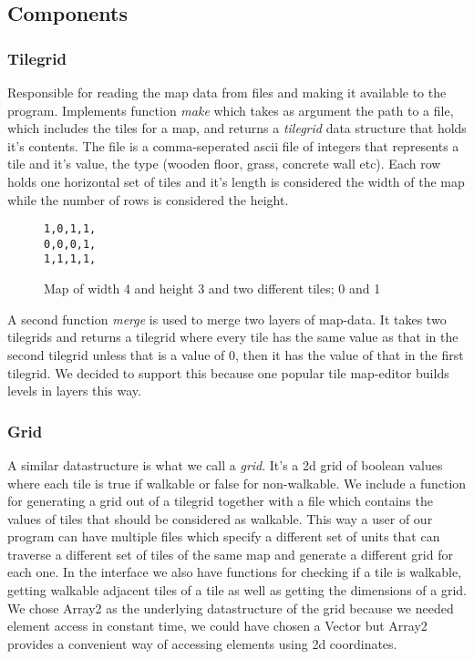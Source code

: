 \documentclass[12pt, a4paper]{article}
\begin{document}
\subsection{Components}

\subsubsection{Tilegrid}


Responsible for reading the map data from files and making it available to
the program. Implements function \textit{make} which takes as argument the
path to a file, which includes the tiles for a map, and returns a
\textit{tilegrid} data structure that holds it's contents. The file is a
comma-seperated ascii file of integers that represents a tile and it's
value, the type (wooden floor, grass, concrete wall etc). Each row holds
one horizontal set of tiles and it's length is considered the width of the
map while the number of rows is considered the height.

\begin{figure}[htbp]

\centering

\texttt{1,0,1,1,\\
0,0,0,1,\\
1,1,1,1,\\
}

\caption{Map of width 4 and height 3 and two different tiles; 0 and 1}

\end{figure}


A second function \textit{merge} is used to merge two layers of map-data.
It takes two tilegrids and returns a tilegrid where every tile has the same
value as that in the second tilegrid unless that is a value of 0, then it
has the value of that in the first tilegrid. We decided to support this
because one popular tile map-editor\cite{mapeditor} builds levels in layers
this way.


\subsubsection{Grid}


A similar datastructure is what we call a \textit{grid}. It's a 2d grid of
boolean values where each tile is true if walkable or false for
non-walkable. We include a function for generating a grid out of a tilegrid
together with a file which contains the values of tiles that should be
considered as walkable. This way a user of our program can have multiple
files which specify a different set of units that can traverse a different
set of tiles of the same map and generate a different grid for each one. In
the interface we also have functions for checking if a tile is walkable,
getting walkable adjacent tiles of a tile as well as getting the dimensions
of a grid. We chose Array2 as the underlying datastructure of the grid
because we needed element access in constant time, we could have chosen a
Vector but Array2 provides a convenient way of accessing elements using 2d
coordinates.
\end{document}
